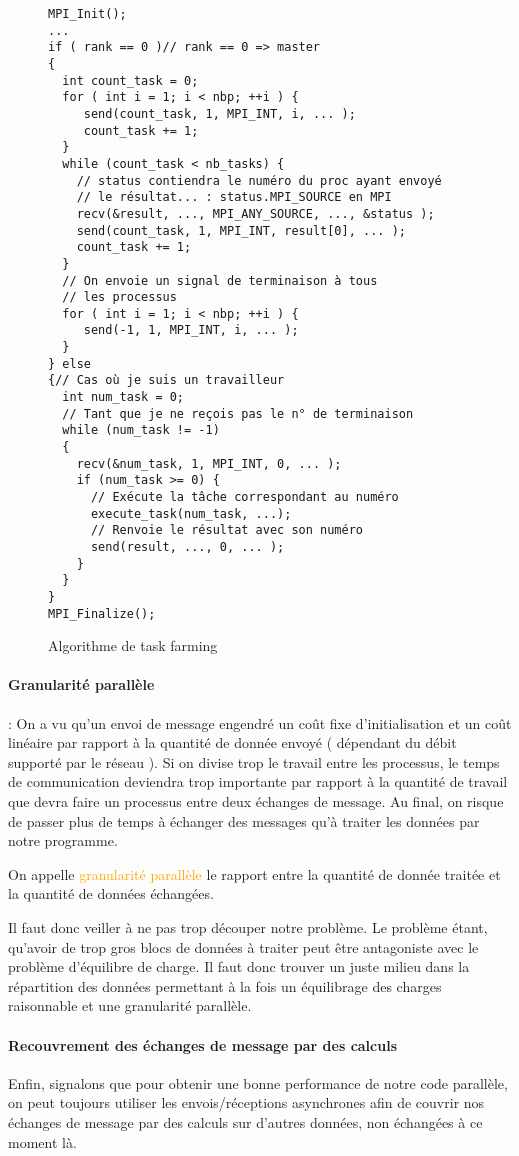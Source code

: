 \documentclass[fleqn,11pt]{article}
\begin{document}
\begin{figure}
\begin{lstlisting}
MPI_Init();
...
if ( rank == 0 )// rank == 0 => master
{
  int count_task = 0;
  for ( int i = 1; i < nbp; ++i ) {
     send(count_task, 1, MPI_INT, i, ... );     
     count_task += 1;
  }
  while (count_task < nb_tasks) {
    // status contiendra le numéro du proc ayant envoyé
    // le résultat... : status.MPI_SOURCE en MPI
    recv(&result, ..., MPI_ANY_SOURCE, ..., &status );
    send(count_task, 1, MPI_INT, result[0], ... );     
    count_task += 1;    
  }
  // On envoie un signal de terminaison à tous
  // les processus
  for ( int i = 1; i < nbp; ++i ) {
     send(-1, 1, MPI_INT, i, ... );     
  }  
} else
{// Cas où je suis un travailleur
  int num_task = 0;
  // Tant que je ne reçois pas le n° de terminaison
  while (num_task != -1)
  {
    recv(&num_task, 1, MPI_INT, 0, ... );
    if (num_task >= 0) {
      // Exécute la tâche correspondant au numéro
      execute_task(num_task, ...);
      // Renvoie le résultat avec son numéro 
      send(result, ..., 0, ... );
    }
  }
}
MPI_Finalize();
\end{lstlisting}
\caption{Algorithme de task farming}
\end{figure}

\paragraph{Granularité parallèle} : On a vu qu'un envoi de message engendré 
un coût fixe d'initialisation et un coût linéaire par rapport à la quantité
de donnée envoyé ( dépendant du débit supporté par le réseau ). Si on divise
trop le travail entre les processus, le temps de communication deviendra trop
importante par rapport à la quantité de travail que devra faire
un processus entre deux échanges de message. Au final, on risque de passer plus
 de temps à échanger des messages qu'à traiter les données par notre programme.
 
 On appelle \textcolor{orange}{granularité parallèle} le rapport entre la quantité de donnée traitée
 et la quantité de données échangées.
 
 Il faut donc veiller à ne pas trop découper notre problème. Le problème étant,
 qu'avoir de trop gros blocs de données à traiter peut être antagoniste avec
 le problème d'équilibre de charge. Il faut donc trouver un juste milieu
 dans la répartition des données permettant à la fois un équilibrage des
 charges raisonnable et une granularité parallèle.

\paragraph{Recouvrement des échanges de message par des calculs}

Enfin, signalons que pour obtenir une bonne performance de notre code parallèle,
on peut toujours utiliser les envois/réceptions asynchrones afin de couvrir
nos échanges de message par des calculs sur d'autres données, non échangées
à ce moment là.
\end{document}
